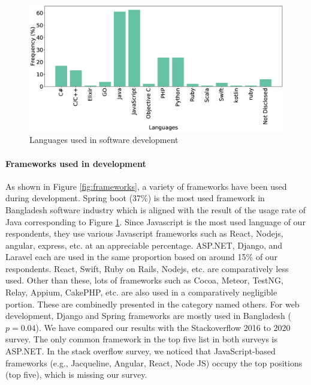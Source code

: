 \begin{figure}[h]
\centering
  \includegraphics[scale=0.18]{Figures/Respondents_languages}
  \caption{Languages used in software development}
  \label{fig:languages}
\end{figure}

\paragraph{Frameworks used in development}
As shown in Figure \ref{fig:frameworks}, a variety of frameworks have been used during development. Spring boot (37\%) is the most used framework in Bangladesh software industry which is aligned with the result of the usage rate of Java corresponding to Figure \ref{fig:languages}. Since Javascript is the most used language of our respondents, they use various Javascript frameworks such as React, Nodejs, angular, express, etc. at an appreciable percentage. ASP.NET, Django, and Laravel each are used in the same proportion based on around 15\% of our respondents. React, Swift, Ruby on Rails, Nodejs, etc. are comparatively less used. Other than these, lots of frameworks such as Cocoa, Meteor, TestNG, Relay, Appium, CakePHP, etc. are also used in a comparatively negligible portion. These are combinedly presented in the category named others. For web development, Django and Spring frameworks are mostly used in Bangladesh ($p=0.04$). We have compared our results with the Stackoverflow 2016 to 2020 survey\cite{StackoverflowSurvey2017, StackoverflowSurvey2018, StackoverflowSurvey2019, StackoverflowSurvey2020}. The only common framework in the top five list in both surveys is ASP.NET. In the stack overflow survey, we noticed that JavaScript-based frameworks (e.g., Jacqueline, Angular, React, Node JS) occupy the top positions (top five), which is missing our survey.

